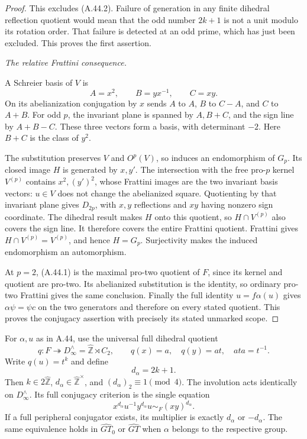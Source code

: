 \begin{proof}
This excludes (A.44.2). Failure of generation
in any finite dihedral reflection quotient
would mean that the odd number \(2k+1\)
is not a unit modulo its rotation order.
That failure is detected at an odd prime,
which has just been excluded. This proves
the first assertion.

\emph{The relative Frattini consequence.}\par
A Schreier basis of \(V\) is
\[
                         A=x^2,\qquad B=yx^{-1},\qquad C=xy.
\]
On its abelianization conjugation by \(x\)
sends \(A\) to \(A\), \(B\) to \(C-A\),
and \(C\) to \(A+B\). For odd \(p\),
the invariant plane is spanned by \(A,B+C\),
and the sign line by \(A+B-C\). These three
vectors form a basis, with determinant \(-2\).
Here \(B+C\) is the class of \(y^2\).

The substitution preserves \(V\) and
\(O^p(V)\), so induces an endomorphism of
\(G_p\). Its closed image \(H\) is generated
by \(x,y'\). The intersection with the free
pro-\(p\) kernel \(V^{(p)}\) contains
\(x^2,(y')^2\), whose Frattini images are
the two invariant basis vectors: \(u\in V\)
does not change the abelianized square.
Quotienting by that invariant plane gives
\(D_{2p}\), with \(x,y\) reflections and
\(xy\) having nonzero sign coordinate.
The dihedral result makes \(H\) onto this
quotient, so \(H\cap V^{(p)}\) also covers
the sign line. It therefore covers the entire
Frattini quotient. Frattini gives
\(H\cap V^{(p)}=V^{(p)}\), and hence
\(H=G_p\). Surjectivity makes the induced
endomorphism an automorphism.

At \(p=2\), (A.44.1) is the maximal pro-two
quotient of \(F\), since its kernel and
quotient are pro-two. Its abelianized
substitution is the identity, so ordinary
pro-two Frattini gives the same conclusion.
Finally the full identity \(u=f\alpha(u)\)
gives \(\alpha\psi=\psi c\) on the two
generators and therefore on every stated
quotient. This proves the conjugacy assertion
with precisely its stated unmarked scope.
\end{proof}

For \(\alpha,u\) as in A.44, use the universal
full dihedral quotient
\[
 q:F\twoheadrightarrow D_\infty^{\wedge}
      =\widehat{\mathbb Z}\rtimes C_2,\qquad
 q(x)=a,\quad q(y)=at,\quad ata=t^{-1}.
\]
Write \(q(u)=t^k\) and define
\[
                          d_\alpha=2k+1.
 \tag{A.45.1}
\]
Then \(k\in2\widehat{\mathbb Z}\),
\(d_\alpha\in\widehat{\mathbb Z}^{\times}\),
and \((d_\alpha)_2\equiv1\pmod4\).
The involution acts identically on
\(D_\infty^{\wedge}\). Its full conjugacy
criterion is the single equation
\[
 x^{d_\alpha}u^{-1}y^{d_\alpha}u
                   \sim_F(xy)^{d_\alpha}.
 \tag{A.45.2}
\]
If a full peripheral conjugator exists, its
multiplier is exactly \(d_\alpha\) or
\(-d_\alpha\). The same equivalence holds
in \(\widehat{GT}_0\) or \(\widehat{GT}\)
when \(\alpha\) belongs to the respective group.

